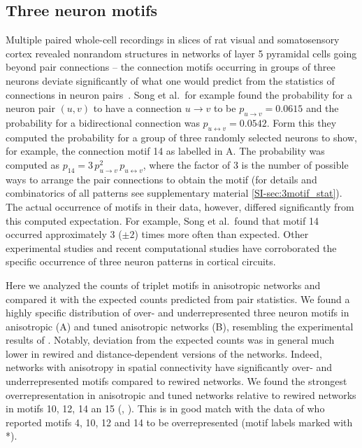 \clearpage
\pagebreak
\newpage
\subsection*{Three neuron motifs}

Multiple paired whole-cell recordings in slices of rat visual and
somatosensory cortex revealed nonrandom structures in networks of
layer 5 pyramidal cells going beyond pair connections -- the
connection motifs occurring in groups of three neurons deviate
significantly of what one would predict from the statistics of
connections in neuron pairs~\cite{Song2005, Perin2011}. Song et
al.~for example found the probability for a neuron pair $(u,v)$ to
have a connection $u \rightarrow v$ to be
$p_{u \rightarrow v}= 0.0615$ and the probability for a bidirectional
connection was $p_{u \leftrightarrow v} = 0.0542$. Form this they
computed the probability for a group of three randomly selected
neurons to show, for example, the connection motif 14 as labelled in
A. The probability was computed as
$p_{14}= 3 \,p_{u \rightarrow v}^2 \, p_{u \leftrightarrow v}$, where
the factor of 3 is the number of possible ways to arrange the pair
connections to obtain the motif (for details and combinatorics of all
patterns see supplementary material \ref{SI-sec:3motif_stat}). The
actual occurrence of motifs in their data, however, differed
significantly from this computed expectation. For example, Song et
al.~found that motif 14 occurred approximately 3 ($\pm 2$) times more
often than expected. Other experimental studies \cite{Perin2011,
  Rieubland2014} and recent computational studies
\cite{Miner2016,Gal2017} have corroborated the specific occurrence of
three neuron patterns in cortical circuits.

Here we analyzed the counts of triplet motifs in anisotropic networks
and compared it with the expected counts predicted from pair
statistics. We found a highly specific distribution of over- and
underrepresented three neuron motifs in anisotropic
(A) and tuned anisotropic networks
(B), resembling the experimental results of
\textcite{Song2005}.%
%
%
%
Notably, deviation from the expected counts was in general much lower
in rewired and distance-dependent versions of the networks. Indeed,
networks with anisotropy in spatial connectivity have significantly
over- and underrepresented motifs compared to rewired networks. We
found the strongest overrepresentation in anisotropic and tuned
networks relative to rewired networks in motifs 10, 12, 14 an 15
(, ). This is in good
match with the data of \textcite{Perin2011} who reported motifs 4, 10,
12 and 14 to be overrepresented (motif labels marked with *).

